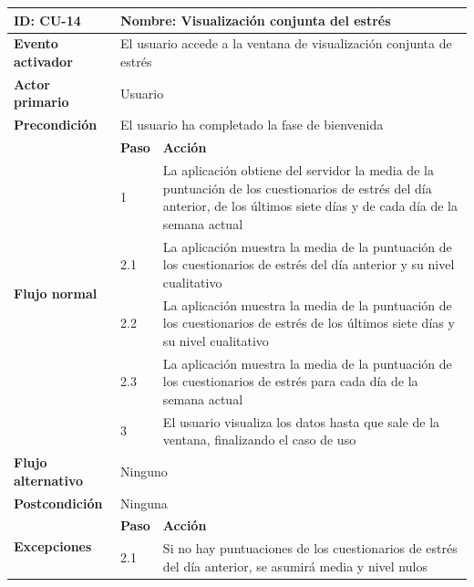             \begin{table}[h]
                \centering
                \begin{tabularx}{\textwidth}{|l|l|X|}
                    \hline
                    \textbf{ID:} CU-14 & \multicolumn{2}{|X|}{\textbf{Nombre}: Visualización conjunta del estrés} \\
                    \hline
                    \textbf{Evento activador} & \multicolumn{2}{|X|}{El usuario accede a la ventana de visualización conjunta de estrés} \\
                    \hline
                    \textbf{Actor primario} & \multicolumn{2}{|X|}{Usuario} \\
                    \hline
                    \textbf{Precondición} & \multicolumn{2}{|X|}{El usuario ha completado la fase de bienvenida} \\
                    \hline
                    \multirow{6}{*}{\textbf{Flujo normal}} & \textbf{Paso} & \textbf{Acción} \\
                    \cline{2-3} & 1 & La aplicación obtiene del servidor la media de la puntuación de los cuestionarios de estrés del día anterior, de los últimos siete días y de cada día de la semana actual \\
                    \cline{2-3} & 2.1 & La aplicación muestra la media de la puntuación de los cuestionarios de estrés del día anterior y su nivel cualitativo \\
                    \cline{2-3} & 2.2 & La aplicación muestra la media de la puntuación de los cuestionarios de estrés de los últimos siete días y su nivel cualitativo \\
                    \cline{2-3} & 2.3 & La aplicación muestra la media de la puntuación de los cuestionarios de estrés para cada día de la semana actual \\
                    \cline{2-3} & 3 & El usuario visualiza los datos hasta que sale de la ventana, finalizando el caso de uso \\
                    \hline
                    \textbf{Flujo alternativo} & \multicolumn{2}{|X|}{Ninguno} \\
                    \hline
                    \textbf{Postcondición} & \multicolumn{2}{|X|}{Ninguna} \\
                    \hline
                    \multirow{4}{*}{\textbf{Excepciones}}  & \textbf{Paso} & \textbf{Acción} \\
                    \cline{2-3} & 2.1 & Si no hay puntuaciones de los cuestionarios de estrés del día anterior, se asumirá media y nivel nulos \\

\end{tabularx}
\end{table}
